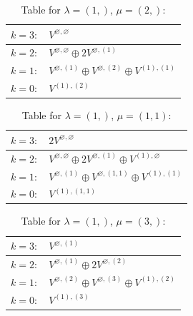 \renewcommand{\arraystretch}{1.6} 
\begin{table}[H]
\centering
\caption{Table for $\lambda = (1,)$, $\mu = (2,)$:}
\begin{tabular}{|>{\centering\arraybackslash}p{15cm}|}
\hline
 $k = 3: \quad V^{\varnothing, \varnothing} $ \\ \hline
 $k = 2: \quad V^{\varnothing, \varnothing} \oplus 2 V^{\varnothing, (1)} $ \\ \hline
 $k = 1: \quad V^{\varnothing, (1)} \oplus V^{\varnothing, (2)} \oplus V^{(1), (1)} $ \\ \hline
 $k = 0: \quad V^{(1), (2)} $ \\ \hline
\end{tabular}
\end{table}

\renewcommand{\arraystretch}{1.6} 
\begin{table}[H]
\centering
\caption{Table for $\lambda = (1,)$, $\mu = (1, 1)$:}
\begin{tabular}{|>{\centering\arraybackslash}p{15cm}|}
\hline
 $k = 3: \quad 2 V^{\varnothing, \varnothing} $ \\ \hline
 $k = 2: \quad V^{\varnothing, \varnothing} \oplus 2 V^{\varnothing, (1)} \oplus V^{(1), \varnothing} $ \\ \hline
 $k = 1: \quad V^{\varnothing, (1)} \oplus V^{\varnothing, (1, 1)} \oplus V^{(1), (1)} $ \\ \hline
 $k = 0: \quad V^{(1), (1, 1)} $ \\ \hline
\end{tabular}
\end{table}

\renewcommand{\arraystretch}{1.6} 
\begin{table}[H]
\centering
\caption{Table for $\lambda = (1,)$, $\mu = (3,)$:}
\begin{tabular}{|>{\centering\arraybackslash}p{15cm}|}
\hline
 $k = 3: \quad V^{\varnothing, (1)} $ \\ \hline
 $k = 2: \quad V^{\varnothing, (1)} \oplus 2 V^{\varnothing, (2)} $ \\ \hline
 $k = 1: \quad V^{\varnothing, (2)} \oplus V^{\varnothing, (3)} \oplus V^{(1), (2)} $ \\ \hline
 $k = 0: \quad V^{(1), (3)} $ \\ \hline
\end{tabular}
\end{table}

